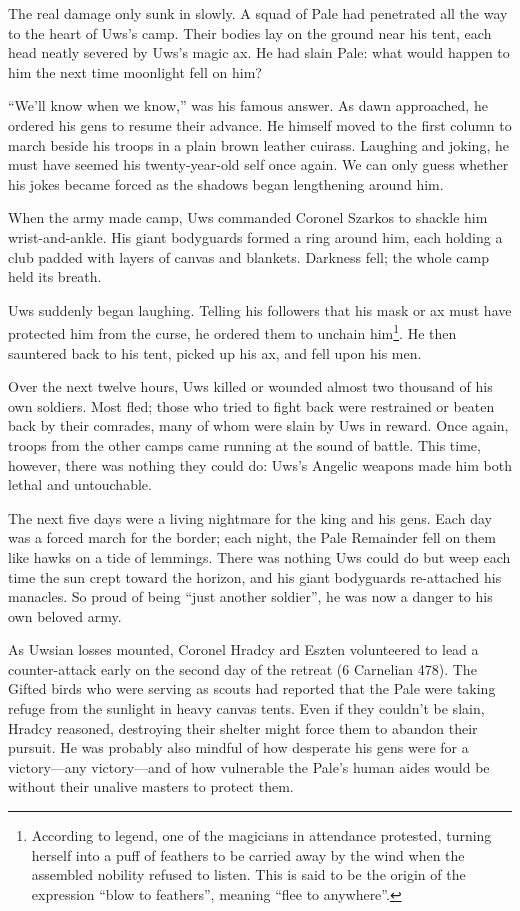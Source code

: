 \documentclass[12pt]{report}
\begin{document}
The real damage only sunk in slowly.  A squad of Pale had penetrated
all the way to the heart of Uws's camp.  Their bodies lay on the
ground near his tent, each head neatly severed by Uws's magic ax.  He
had slain Pale: what would happen to him the next time moonlight fell
on him?

``We'll know when we know,'' was his famous answer.  As dawn approached,
he ordered his gens to resume their advance.  He himself moved to the
first column to march beside his troops in a plain brown leather
cuirass.  Laughing and joking, he must have seemed his twenty-year-old
self once again.  We can only guess whether his jokes became forced as
the shadows began lengthening around him.

When the army made camp, Uws commanded Coronel Szarkos to shackle him
wrist-and-ankle.  His giant bodyguards formed a ring around him, each
holding a club padded with layers of canvas and blankets.  Darkness
fell; the whole camp held its breath.

Uws suddenly began laughing.  Telling his followers that his mask or
ax must have protected him from the curse, he ordered them to unchain
him\footnote{According to legend, one of the magicians in attendance
protested, turning herself into a puff of feathers to be carried away
by the wind when the assembled nobility refused to listen.  This is
said to be the origin of the expression ``blow to feathers'', meaning
``flee to anywhere''.}.  He then sauntered back to his tent, picked up
his ax, and fell upon his men.

Over the next twelve hours, Uws killed or wounded almost two thousand
of his own soldiers.  Most fled; those who tried to fight back were
restrained or beaten back by their comrades, many of whom were slain
by Uws in reward.  Once again, troops from the other camps came
running at the sound of battle.  This time, however, there was nothing
they could do: Uws's Angelic weapons made him both lethal and
untouchable.

The next five days were a living nightmare for the king and his gens.
Each day was a forced march for the border; each night, the Pale
Remainder fell on them like hawks on a tide of lemmings.  There was
nothing Uws could do but weep each time the sun crept toward the
horizon, and his giant bodyguards re-attached his manacles.  So proud
of being ``just another soldier'', he was now a danger to his own
beloved army.

As Uwsian losses mounted, Coronel Hradcy ard Eszten volunteered to
lead a counter-attack early on the second day of the retreat (6
Carnelian 478).  The Gifted birds who were serving as scouts had
reported that the Pale were taking refuge from the sunlight in heavy
canvas tents.  Even if they couldn't be slain, Hradcy reasoned,
destroying their shelter might force them to abandon their pursuit.
He was probably also mindful of how desperate his gens were for a
victory---any victory---and of how vulnerable the Pale's human aides
would be without their unalive masters to protect them.
\end{document}
